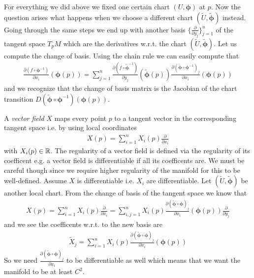 \documentclass[../master_thesis.tex]{subfiles}
\begin{document}
For everything we did above we fixed one certain chart $(U,\boldsymbol{\phi})$ at $p$.
Now the question arises what happens when we choose a different chart 
$(\tilde{U}, \tilde{\boldsymbol{\phi}})$ instead.
Going through the same steps we end up with another basis 
$\{ \frac{\partial}{\partial y_j} \}_{j=1}^n$ of the tangent space $T_p M$
which are the derivatives w.r.t. the chart 
$(\tilde{U}, \tilde{\boldsymbol{\phi}})$. 
Let us compute the change of basis.
Using the chain rule 
we can easily compute that 
\begin{align*}
    \frac{\partial (f \circ \boldsymbol{\phi}^{-1})}{\partial x_i} (\boldsymbol{\phi}(p))
    =\sum_{j=1}^n \frac{\partial (f \circ \tilde{\boldsymbol{\phi}}^{-1})}{\partial y_j} (\tilde{\boldsymbol{\phi}}(p))
        \frac{\partial (\tilde{\boldsymbol{\phi}} \circ \boldsymbol{\phi}^{-1})_j}{\partial x_i}(\boldsymbol{\phi}(p)) 
\end{align*}
and we recognize that the change of basis matrix is the Jacobian of 
the chart transition $D(\tilde{\bm{\phi}} \circ \boldsymbol{\phi}^{-1})(\boldsymbol{\phi}(p))$.

A \textit{vector field} $X$ maps every point $p$ to a tangent vector 
in the corresponding tangent space i.e. by using local coordinates
\begin{align*}
    X(p) = \sum_{i=1}^n X_i(p) \frac{\partial}{\partial x_i}
\end{align*}
with $X_i(p) \in \mathbb{R}$. The regularity of a vector field is defined via the
regularity of its coefficent e.g. a vector field is differentiable if 
all its coefficents are. We must be careful though since we require higher 
regularity of the manifold for this to be well-defined. 
Assume $X$ is differentiable i.e. $X_i$ are differentiable. 
Let $(\tilde{U}, \tilde{\bm{\phi}})$ 
be another local chart.
From the 
change of basis of the tangent space we know that 
\begin{align*}
    X(p) = \sum_{i=1}^n X_i(p) \frac{\partial}{\partial x_i}
    = \sum_{i,j=1}^n X_i(p) \frac{\partial (\tilde{\boldsymbol{\phi}} 
        \circ \boldsymbol{\phi})_j}{\partial x_i}(\boldsymbol{\phi}(p))
        \frac{\partial}{\partial y_j}
\end{align*}
and we see the coefficents w.r.t. to the new basis are 
\begin{align*}
    \tilde{X}_j = \sum_{i=1}^n X_i(p) \frac{\partial (\tilde{\boldsymbol{\phi}} 
    \circ \boldsymbol{\phi})_j}{\partial x_i}(\boldsymbol{\phi}(p))        
\end{align*}
So we need $\frac{\partial (\tilde{\boldsymbol{\phi}} \circ \boldsymbol{\phi})_j}{\partial x_i}$ to be 
differentiable as well which means that we want the manifold to be at least $C^2$.
\end{document}

